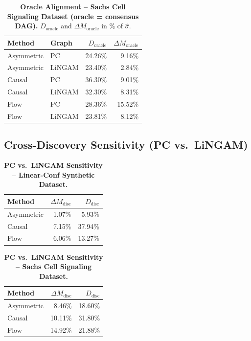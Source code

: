 \documentclass[12pt,letterpaper,twocolumn]{article}
\begin{document}
\begin{table}[H]
  \centering
  \caption{\textbf{Oracle Alignment -- Sachs Cell Signaling Dataset (oracle = consensus
  DAG).} $D_{\text{oracle}}$ and $\Delta M_{\text{oracle}}$ in \% of $\hat{\sigma}$.}
  \label{tab:oracle_sachs}
  \begin{tabular}{llrr}
    \toprule
    \textbf{Method} & \textbf{Graph} & $D_{\text{oracle}}$ & $\Delta M_{\text{oracle}}$ \\
    \midrule
    Asymmetric & PC     & 24.26\% & 9.16\%  \\
    Asymmetric & LiNGAM & 23.40\% & 2.84\%  \\
    Causal     & PC     & 36.30\% & 9.01\%  \\
    Causal     & LiNGAM & 32.30\% & 8.31\%  \\
    Flow       & PC     & 28.36\% & 15.52\% \\
    Flow       & LiNGAM & 23.81\% & 8.12\%  \\
    \bottomrule
  \end{tabular}
\end{table}

\subsection{Cross-Discovery Sensitivity (PC vs.\ LiNGAM)}

\begin{table}[H]
  \centering
  \caption{\textbf{PC vs.\ LiNGAM Sensitivity -- Linear-Conf Synthetic Dataset.}}
  \label{tab:disc_synth}
  \begin{tabular}{lrr}
    \toprule
    \textbf{Method} & $\Delta M_{\text{disc}}$ & $D_{\text{disc}}$ \\
    \midrule
    Asymmetric & 1.07\%  & 5.93\%  \\
    Causal     & 7.15\%  & 37.94\% \\
    Flow       & 6.06\%  & 13.27\% \\
    \bottomrule
  \end{tabular}
\end{table}

\begin{table}[H]
  \centering
  \caption{\textbf{PC vs.\ LiNGAM Sensitivity -- Sachs Cell Signaling Dataset.}}
  \label{tab:disc_sachs}
  \begin{tabular}{lrr}
    \toprule
    \textbf{Method} & $\Delta M_{\text{disc}}$ & $D_{\text{disc}}$ \\
    \midrule
    Asymmetric & 8.46\%  & 18.60\% \\
    Causal     & 10.11\% & 31.80\% \\
    Flow       & 14.92\% & 21.88\% \\
    \bottomrule
  \end{tabular}
\end{table}
\end{document}
